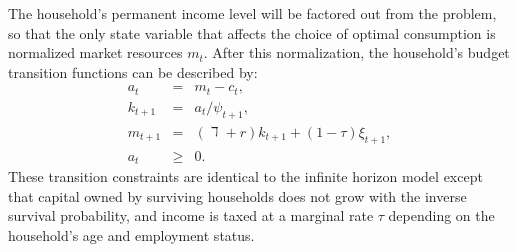 \documentclass{econtex}\usepackage[pdftex]{graphicx}\usepackage{epstopdf} \usepackage[pdftex]{hyperref}
\newcommand{\aRat}{\ensuremath{a}}
\newcommand{\cRat}{\ensuremath{c}}
\newcommand{\kRat}{\ensuremath{k}}
\newcommand{\mRat}{\ensuremath{m}}
\newcommand{\pshk}{\psi} %
\newcommand{\rProd}{\ensuremath{\mathit{r}}}
\newcommand{\tshk}{\xi} %
\begin{document}
The household's permanent income level will be factored out from the problem, so that the only state variable that affects the choice of optimal consumption is normalized market resources $\mRat_t$.  After this normalization, the household's budget transition functions can be described by:
\begin{eqnarray}
\label{LifeCycleConstraint1}
\aRat_t &=& \mRat_t - \cRat_t,\\
\label{LifeCycleConstraint2}
\kRat_{t+1} &=& \aRat_t/\pshk_{t+1},\\
\label{LifeCycleConstraint3}
\mRat_{t+1} &=& (\daleth +\rProd) \kRat_{t+1} + (1 - \tau)\tshk_{t+1},\\
\label{LifeCycleConstraint4}
\aRat_t &\geq& 0.
\end{eqnarray}
These transition constraints are identical to the infinite horizon model except that capital owned by surviving households does not grow with the inverse survival probability, and income is taxed at a marginal rate $\tau$ depending on the household's age and employment status.
\end{document}
